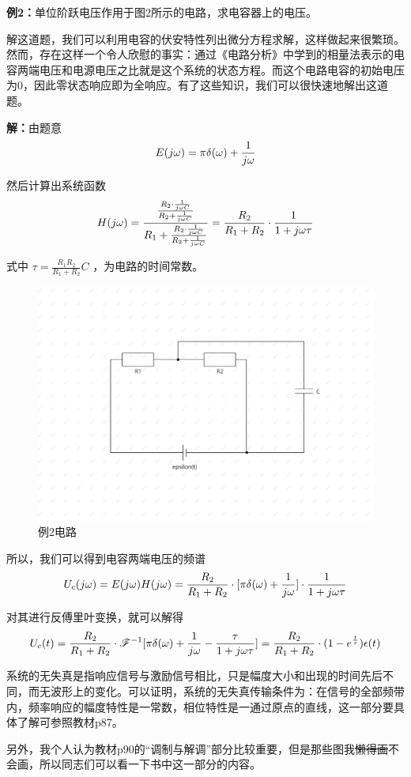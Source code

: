 \documentclass[UTF8,a4paper,11pt]{article}
\begin{document}
\textbf{例2：}单位阶跃电压作用于图2所示的电路，求电容器上的电压。

解这道题，我们可以利用电容的伏安特性列出微分方程求解，这样做起来很繁琐。然而，存在这样一个令人欣慰的事实：通过《电路分析》中学到的相量法表示的电容两端电压和电源电压之比就是这个系统的状态方程。而这个电路电容的初始电压为0，因此零状态响应即为全响应。有了这些知识，我们可以很快速地解出这道题。

\textbf{解：}由题意
\begin{equation}
E(j\omega)=\pi\delta(\omega)+\frac{1}{j\omega}
\notag
\end{equation}

然后计算出系统函数
\begin{equation}
H(j\omega)=\frac{\frac{R_2\cdot\frac{1}{j\omega C}}{R_2+\frac{1}{j\omega C}}}{R_1+\frac{R_2\cdot\frac{1}{j\omega C}}{R_2+\frac{1}{j\omega C}}}=\frac{R_2}{R_1+R_2}\cdot\frac{1}{1+j\omega\tau}
\notag
\end{equation}

式中 $\tau=\frac{R_1R_2}{R_1+R_2}C$ ，为电路的时间常数。
\begin{figure}[htbp]
\centering
\includegraphics[scale=0.1]{c1.png}
\caption{例2电路}
\label{figure}
\end{figure}

所以，我们可以得到电容两端电压的频谱
\begin{equation}
U_c(j\omega)=E(j\omega)H(j\omega)=\frac{R_2}{R_1+R_2}\cdot[\pi\delta(\omega)+\frac{1}{j\omega}]\cdot\frac{1}{1+j\omega\tau}
\notag
\end{equation}

对其进行反傅里叶变换，就可以解得
\begin{equation}
U_c(t)=\frac{R_2}{R_1+R_2}\cdot\mathscr{F}^{-1}[\pi\delta(\omega)+\frac{1}{j\omega}-\frac{\tau}{1+j\omega\tau}]=\frac{R_2}{R_1+R_2}\cdot(1-e^{\frac{t}{\tau}})\epsilon(t)
\notag
\end{equation}

系统的无失真是指响应信号与激励信号相比，只是幅度大小和出现的时间先后不同，而无波形上的变化。可以证明，系统的无失真传输条件为：在信号的全部频带内，频率响应的幅度特性是一常数，相位特性是一通过原点的直线，这一部分要具体了解可参照教材p87。

另外，我个人认为教材p90的“调制与解调”部分比较重要，但是那些图我\sout{懒得画}不会画，所以同志们可以看一下书中这一部分的内容。
\end{document}
